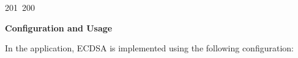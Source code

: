 201~200~\documentclass{article}
\begin{document}
	                                                                                                                                                                                                                                                                                                	                                                                                                                                        	    	                                                                                                	                                                                                                                                                                                                                                                                                                                                	                                                                        	                                                                        	                                                                                                                                        	                                                                                                                                                                                                                        	                                                                                    \textbf{Configuration and Usage}

	                                                                                                                                                                                                                                                                                                	                                                                                                                                        	    	                                                                                                	                                                                                                                                                                                                                                                                                                                                	                                                                        	                                                                        	                                                                                                                                        	                                                                                                                                                                                                                        	                                                                                    In the application, ECDSA is implemented using the following configuration:
\end{document}

